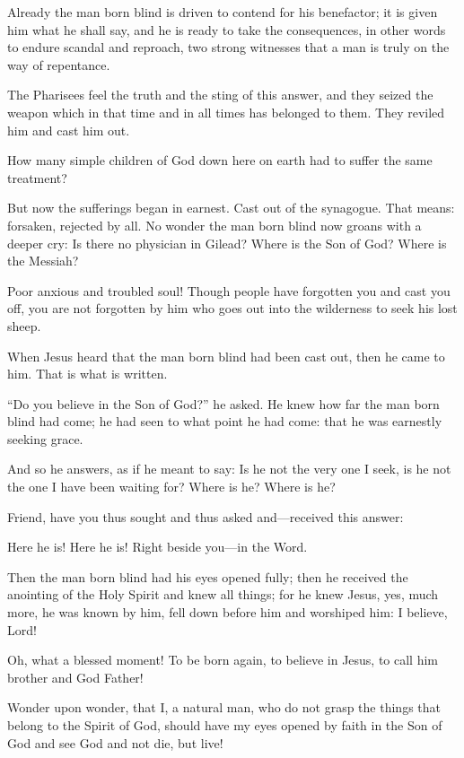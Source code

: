 Already the man born blind is driven to contend for his benefactor; it is given him what he shall say, and he is ready to take the consequences, in other words to endure scandal and reproach, two strong witnesses that a man is truly on the way of repentance.

The Pharisees feel the truth and the sting of this answer, and they seized the weapon which in that time and in all times has belonged to them. They reviled him and cast him out.

How many simple children of God down here on earth had to suffer the same treatment?

But now the sufferings began in earnest. Cast out of the synagogue. That means: forsaken, rejected by all. No wonder the man born blind now groans with a deeper cry: Is there no physician in Gilead? Where is the Son of God? Where is the Messiah?

Poor anxious and troubled soul! Though people have forgotten you and cast you off, you are not forgotten by him who goes out into the wilderness to seek his lost sheep.

When Jesus heard that the man born blind had been cast out, then he came to him. That is what is written.

“Do you believe in the Son of God?” he asked. He knew how far the man born blind had come; he had seen to what point he had come: that he was earnestly seeking grace.

And so he answers, as if he meant to say: Is he not the very one I seek, is he not the one I have been waiting for? Where is he? Where is he?

Friend, have you thus sought and thus asked and—received this answer:

Here he is! Here he is! Right beside you—in the Word.

Then the man born blind had his eyes opened fully; then he received the anointing of the Holy Spirit and knew all things; for he knew Jesus, yes, much more, he was known by him, fell down before him and worshiped him: I believe, Lord!

Oh, what a blessed moment! To be born again, to believe in Jesus, to call him brother and God Father!

Wonder upon wonder, that I, a natural man, who do not grasp the things that belong to the Spirit of God, should have my eyes opened by faith in the Son of God and see God and not die, but live!